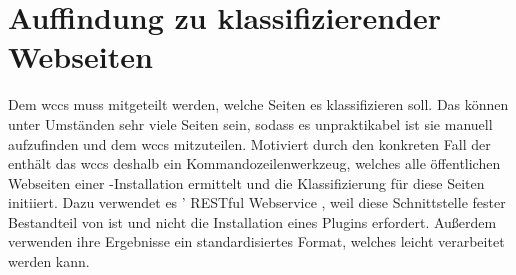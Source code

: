 \section{Auffindung zu klassifizierender Webseiten}
    \label{section:conceptCrawler}
    Dem \gls{wccs} muss mitgeteilt werden, welche Seiten es klassifizieren soll.
    Das können unter Umständen sehr viele Seiten sein,
    sodass es unpraktikabel ist sie manuell aufzufinden
    und dem \gls{wccs} mitzuteilen.
    Motiviert durch den konkreten Fall der {\fernUni} enthält das \gls{wccs}
    deshalb ein Kommandozeilenwerkzeug, welches alle öffentlichen Webseiten einer
    {\wordpress}-Installation ermittelt und die Klassifizierung für diese Seiten initiiert.
    Dazu verwendet es {\wordpress}' RESTful Webservice \cite[Kapitel "`REST API Handbook"']{wordpress:codex},
    weil diese Schnittstelle fester Bestandteil von {\wordpress} ist und nicht die
    Installation eines Plugins erfordert.
    Außerdem verwenden ihre Ergebnisse ein standardisiertes Format,
    welches leicht verarbeitet werden kann.
